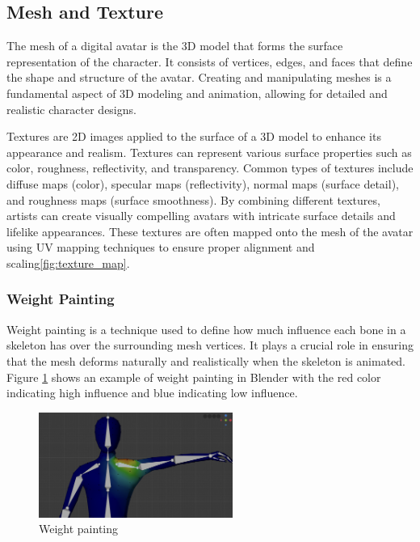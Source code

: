 \documentclass[../../main.tex]{subfiles}
\begin{document}
\subsection{Mesh and Texture}

The mesh of a digital avatar is the 3D model that forms the surface representation of the character. It consists of vertices, edges, and faces that define the shape and structure of the avatar. Creating and manipulating meshes is a fundamental aspect of 3D modeling and animation, allowing for detailed and realistic character designs.

Textures are 2D images applied to the surface of a 3D model to enhance its appearance and realism. Textures can represent various surface properties such as color, roughness, reflectivity, and transparency. Common types of textures include diffuse maps (color), specular maps (reflectivity), normal maps (surface detail), and roughness maps (surface smoothness). By combining different textures, artists can create visually compelling avatars with intricate surface details and lifelike appearances. These textures are often mapped onto the mesh of the avatar using UV mapping techniques to ensure proper alignment and scaling\ref{fig:texture_map}.

\subsubsection{Weight Painting}

Weight painting is a technique used to define how much influence each bone in a skeleton has over the surrounding mesh vertices. It plays a crucial role in ensuring that the mesh deforms naturally and realistically when the skeleton is animated. Figure \ref{fig:weight_painting} shows an example of weight painting in Blender with the red color indicating high influence and blue indicating low influence.

\begin{figure}
  \centering \includegraphics[width = 2.5in]{chapters/background_work/images/weight_painting.png}
  \caption{Weight painting}
  \label{fig:weight_painting}
\end{figure}
\end{document}
